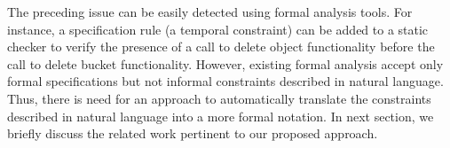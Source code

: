 The preceding issue can be easily detected using formal analysis tools.
For instance, a specification rule (a temporal constraint) can be added to a static checker to verify
the presence of a call to delete object functionality before the call to delete bucket functionality.
However, existing formal analysis accept only formal specifications but not informal constraints described in natural language.
Thus, there is need for an approach to automatically translate the constraints described in natural language into a more formal notation.
In next section, we briefly discuss the related work pertinent to our proposed approach.


 








